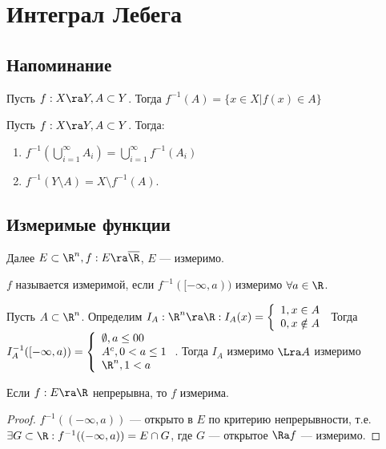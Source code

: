 \section{Интеграл Лебега}
\subsection{Напоминание}
\begin{definition}
    Пусть \(f: X \ra Y, A \subset Y\). Тогда \(f^{-1}(A) = \{x \in X | f(x) \in A\}\)
\end{definition}

\begin{note}
    Пусть \(f: X \ra Y, A \subset Y\). Тогда:
    \begin{enumerate}
        \item \(f^{-1}(\bigcup_{i = 1}^\infty A_i) = \bigcup_{i = 1}^\infty f^{-1}(A_i)\)
        \item \(f^{-1}(Y \setminus A) = X \setminus f^{-1}(A)\).
    \end{enumerate}    
\end{note}

\subsection{Измеримые функции}
Далее \(E \subset \R^n, f: E \ra \overline{\R}\), \(E\) --- измеримо.
\begin{definition}
    \(f\) называется измеримой, если \(f^{-1}([-\infty, a))\) измеримо \(\forall a \in \R\).
\end{definition}

\begin{example}
    Пусть \(A \subset \R^n\). Определим \(I_A: \R^n \ra \R: I_A(x) = \left\{\begin{array}{l}
        1, x \in A \\
        0, x \notin A
    \end{array}\right.\)
    Тогда \(I_A^{-1}([-\infty, a)) = \left\{\begin{array}{l}
        \emptyset, a \le 0 0 \\
        A^c, 0 < a \le 1 \\
        \R^n, 1 < a \\
    \end{array}\right.\).
    Тогда \(I_A\) измеримо \(\Lra A\) измеримо
\end{example}

\begin{proposition}
    Если \(f: E \ra \R\) непрерывна, то \(f\) измерима.
\end{proposition}
\begin{proof}
    \(f^{-1}((-\infty, a))\) --- открыто в \(E\) по критерию непрерывности, т.е. \(\exists G \subset \R: f^{-1}((-\infty, a)) = E \cap G\), где \(G\) --- открытое \(\Ra f\) --- измеримо.
\end{proof}

